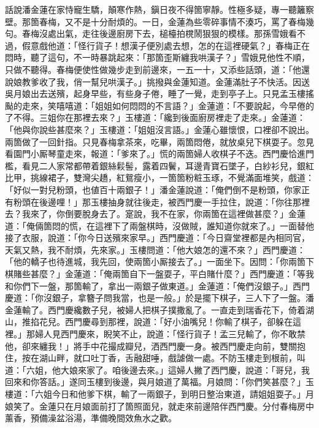 話說潘金蓮在家恃寵生驕，顛寒作熱，鎭日夜不得箇寧靜。性極多疑，專一聽籬察壁。那箇春梅，又不是十分耐煩的。一日，金蓮為些零碎事情不湊巧，罵了春梅幾句。春梅沒處出氣，走往後邊廚房下去，槌檯拍櫈鬧狠狠的模樣。那孫雪娥看不過，假意戲他道：「怪行貨子！想漢子便別處去想，怎的在這裡硬氣？」{}春梅正在悶時，聽了這句，不一時暴跳起來：「那箇歪斯纏我哄漢子？」雪娥見他性不順，只做不聽得。春梅便使性做幾步走到前邊來，一五一十，又添些話頭，道：「他還說娘教爹收了我，俏一幫兒哄漢子。」挑撥與金蓮知道。金蓮滿肚子不快活。因送吳月娘出去送殯，起身早些，有些身子倦，睡了一覺，走到亭子上。只見孟玉樓搖颭的走來，{}笑嘻嘻道：「姐姐如何悶悶的不言語？」金蓮道：「不要說起，今早倦的了不得。三姐你在那裡去來？」玉樓道：「纔到後面廚房裡走了走來。」金蓮道：「他與你說些甚麼來？」玉樓道：「姐姐沒言語。」金蓮心雖懷恨，口裡卻不說出。兩箇做了一回針指。只見春梅拿茶來，吃畢，兩箇悶倦，就放桌兒下棋耍子。忽見看園門小厮琴童走來，{}報道：「爹來了。」慌的兩箇婦人收棋子不迭。西門慶恰進門檻，看見二人家常都帶着銀絲鬏髻，露着四鬢，耳邊青寶石墜子，白紗衫兒，銀紅比甲，挑線裙子，雙灣尖趫，紅鴛瘦小，一箇箇粉粧玉琢，不覺滿面堆笑，戲道：「好似一對兒粉頭，也値百十兩銀子！」潘金蓮說道：「俺們倒不是粉頭，你家正有粉頭在後邊哩！」{}那玉樓抽身就往後走，被西門慶一手拉住，說道：「你往那裡去？我來了，你倒要脫身去了。寔說，我不在家，你兩箇在這裡做甚麼？」金蓮道：「俺倆箇悶的慌，在這裡下了兩盤棋時，沒做賊，誰知道你就來了。」一面替他接了衣服，說道：「你今日送殯來家早。」西門慶道：「今日齋堂裡都是內相同官，天氣又熱，我不耐煩，先來家。」玉樓問道：「他大娘怎的還不來？」西門慶道：「他的轎子也待進城，我先回，使兩箇小厮接去了。」一面坐下。因問：「你兩箇下棋賭些甚麼？」金蓮道：「俺兩箇自下一盤耍子，平白賭什麼？」西門慶道：「等我和你們下一盤，那箇輸了，拿出一兩銀子做東道。」金蓮道：「俺們沒銀子。」西門慶道：「你沒銀子，拿簪子問我當，也是一般。」於是擺下棋子，三人下了一盤。潘金蓮輸了。{}西門慶纔數子兒，被婦人把棋子撲撒亂了。一直走到瑞香花下，倚着湖山，推掐花兒。西門慶尋到那裡，說道：「好小油嘴兒！你輸了棋子，卻躲在這裡。」那婦人見西門慶來，睨笑不止，說道：「怪行貨子！孟三兒輸了，你不敢禁他，卻來纏我！」將手中花撮成瓣兒，洒西門慶一身。{}被西門慶走向前，雙關抱住，按在湖山畔，就口吐丁香，舌融甜唾，戲謔做一處。不防玉樓走到根前，叫道：「六姐，他大娘來家了。咱後邊去來。」這婦人撇了西門慶，說道：「哥兒，我回來和你答話。」{}遂同玉樓到後邊，與月娘道了萬福。月娘問：「你們笑甚麼？」玉樓道：「六姐今日和他爹下棋，輸了一兩銀子，到明日整治東道，請姐姐耍子。」月娘笑了。金蓮只在月娘面前打了箇照面兒，就走來前邊陪伴西門慶。分付春梅房中薰香，預備澡盆浴湯，準備晚間效魚水之歡。

